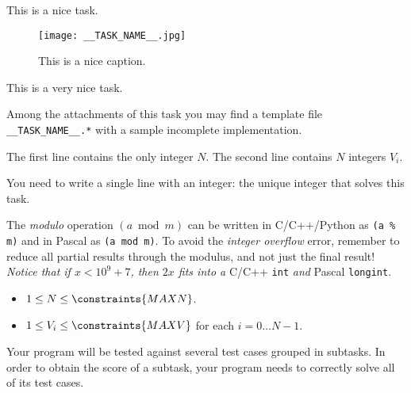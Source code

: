 \usepackage{xcolor}
\usepackage{afterpage}
\usepackage{pifont,mdframed}
\usepackage[bottom]{footmisc}

\makeatletter
\gdef\this@inputfilename{input}
\gdef\this@outputfilename{output}
\makeatother


This is a nice task.

\begin{figure}[H]
    \centering
    \texttt{[image: \_\_TASK\_NAME\_\_.jpg]}
    \caption{This is a nice caption.}
\end{figure}

This is a very nice task.

\begin{warning}
Among the attachments of this task you may find a template file \texttt{__TASK_NAME__.*} with a sample incomplete implementation.
\end{warning}

\InputFile
The first line contains the only integer $N$. The second line contains $N$ integers $V_i$.

\OutputFile
You need to write a single line with an integer: the unique integer that solves this task.


\begin{danger}
The \emph{modulo} operation $(a \bmod m)$ can be written in C/C++/Python as \verb|(a % m)| and in Pascal as \verb|(a mod m)|. To avoid the \emph{integer overflow} error, remember to reduce all partial results through the modulus, and not just the final result! \\
\emph{Notice that if $x < 10^9 + 7$, then $2 x$ fits into a} C/C++ \verb|int| \emph{and} Pascal \verb|longint|.
\end{danger}


\Constraints
\begin{itemize}[nolistsep, itemsep=2mm]
	\item $1 \le N \le \constraints{MAXN}$.
	\item $1 \le V_i \le \constraints{MAXV}$ for each $i=0\ldots N-1$.
\end{itemize}

\Scoring
Your program will be tested against several test cases grouped in subtasks.
In order to obtain the score of a subtask, your program needs to correctly solve all of its test cases.

